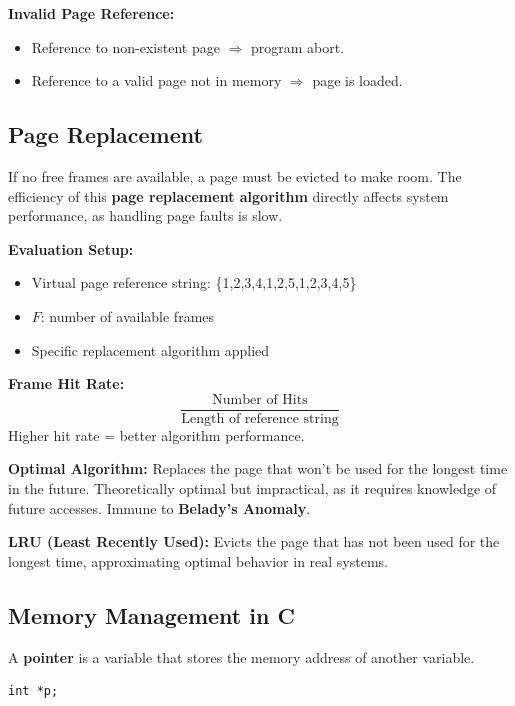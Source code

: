\documentclass[a4paper, 10pt]{article}
\begin{document}
\textbf{Invalid Page Reference:}
\begin{itemize}
    \item Reference to non-existent page $\Rightarrow$ program abort.
    \item Reference to a valid page not in memory $\Rightarrow$ page is loaded.
\end{itemize}

\subsection{Page Replacement}
If no free frames are available, a page must be evicted to make room. The efficiency of this \textbf{page replacement algorithm} directly affects system performance, as handling page faults is slow.

\textbf{Evaluation Setup:}
\begin{itemize}
    \item Virtual page reference string: \{1,2,3,4,1,2,5,1,2,3,4,5\}
    \item $F$: number of available frames
    \item Specific replacement algorithm applied
\end{itemize}

\textbf{Frame Hit Rate:}
\[
    \frac{\text{Number of Hits}}{\text{Length of reference string}}
\]
Higher hit rate = better algorithm performance.

\textbf{Optimal Algorithm:}
Replaces the page that won’t be used for the longest time in the future. Theoretically optimal but impractical, as it requires knowledge of future accesses. Immune to \textbf{Belady’s Anomaly}.

\textbf{LRU (Least Recently Used):}
Evicts the page that has not been used for the longest time, approximating optimal behavior in real systems.

\subsection{Memory Management in C}

\begin{conceptbox}{}{}
    A \textbf{pointer} is a variable that stores the memory address of another variable.
\end{conceptbox}

\begin{verbatim}
int *p;
\end{verbatim}
\end{document}
